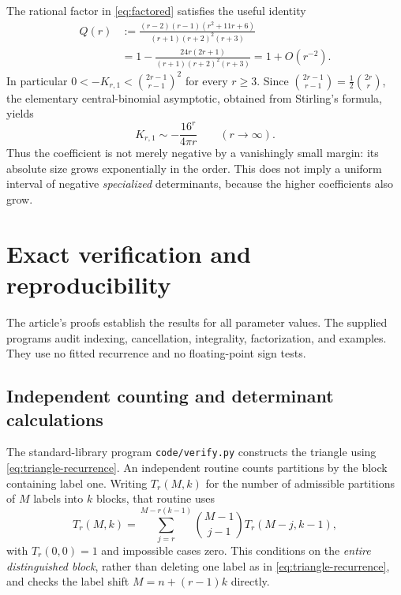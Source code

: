 \documentclass[11pt,a4paper]{article}
\theoremstyle{definition}
\numberwithin{equation}{section}
\begin{document}
The rational factor in \eqref{eq:factored} satisfies the useful identity
\begin{equation}
 \begin{split}
 Q(r)&:=\frac{(r-2)(r-1)(r^2+11r+6)}{(r+1)(r+2)^2(r+3)}\\
     &=1-\frac{24r(2r+1)}{(r+1)(r+2)^2(r+3)}
       =1+O(r^{-2}).
 \end{split}
 \label{eq:Qasym}
\end{equation}
In particular $0<-K_{r,1}<\binom{2r-1}{r-1}^2$ for every $r\ge3$.
Since $\binom{2r-1}{r-1}=\tfrac12\binom{2r}{r}$, the elementary
central-binomial asymptotic, obtained from Stirling's formula, yields
\begin{equation}
 K_{r,1}\sim-\frac{16^r}{4\pi r}\qquad(r\to\infty).
 \label{eq:order-asymptotic}
\end{equation}
Thus the coefficient is not merely negative by a vanishingly small
margin: its absolute size grows exponentially in the order. This does
not imply a uniform interval of negative \emph{specialized}
determinants, because the higher coefficients also grow.

\section{Exact verification and reproducibility}
\label{sec:computation}

The article's proofs establish the results for all parameter values.
The supplied programs audit indexing, cancellation, integrality,
factorization, and examples. They use no fitted recurrence and no
floating-point sign tests.

\subsection{Independent counting and determinant calculations}

The standard-library program \texttt{code/verify.py} constructs the
triangle using \eqref{eq:triangle-recurrence}. An independent routine
counts partitions by the block containing label one. Writing $T_r(M,k)$
for the number of admissible partitions of $M$ labels into $k$ blocks,
that routine uses
\begin{equation}
 T_r(M,k)=\sum_{j=r}^{M-r(k-1)}
       \binom{M-1}{j-1}T_r(M-j,k-1),
 \label{eq:independent-count}
\end{equation}
with $T_r(0,0)=1$ and impossible cases zero. This conditions on the
\emph{entire distinguished block}, rather than deleting one label as in
\eqref{eq:triangle-recurrence}, and checks the label shift
$M=n+(r-1)k$ directly.
\end{document}
